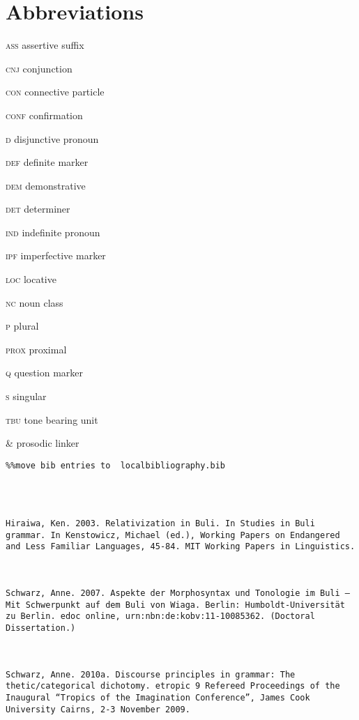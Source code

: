 \documentclass[output=paper]{langsci/langscibook}
\begin{document}
\section*{Abbreviations}

\textsc{ass}  assertive suffix

\textsc{cnj}  conjunction

\textsc{con}  connective particle

\textsc{conf}  confirmation

\textsc{d}  disjunctive pronoun

\textsc{def}  definite marker

\textsc{dem}  demonstrative

\textsc{det}  determiner

\textsc{ind}  indefinite pronoun

\textsc{ipf}  imperfective marker

\textsc{loc}  locative

\textsc{nc}  noun class

\textsc{p}  plural

\textsc{prox}  proximal

\textsc{q}  question marker

\textsc{s}  singular

\textsc{tbu}  tone bearing unit

\& prosodic linker


\begin{verbatim}%%move bib entries to  localbibliography.bib




Hiraiwa, Ken. 2003. Relativization in Buli. In Studies in Buli grammar. In Kenstowicz, Michael (ed.), Working Papers on Endangered and Less Familiar Languages, 45-84. MIT Working Papers in Linguistics.



Schwarz, Anne. 2007. Aspekte der Morphosyntax und Tonologie im Buli – Mit Schwerpunkt auf dem Buli von Wiaga. Berlin: Humboldt-Universität zu Berlin. edoc online, urn:nbn:de:kobv:11-10085362. (Doctoral Dissertation.)



Schwarz, Anne. 2010a. Discourse principles in grammar: The thetic/categorical dichotomy. etropic 9 Refereed Proceedings of the Inaugural “Tropics of the Imagination Conference”, James Cook University Cairns, 2-3 November 2009.



\end{verbatim}
 

\printbibliography[heading=subbibliography,notkeyword=this]
\end{document}

